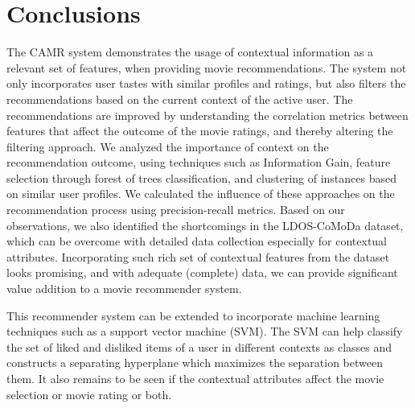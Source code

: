 \documentclass{article}
\begin{document}
%  
%
%
%

\section{Conclusions}

The CAMR system demonstrates the usage of contextual information as a relevant set of features, when providing movie recommendations. The system not only incorporates user tastes with similar profiles and ratings, but also filters the recommendations based on the current context of the active user. The recommendations are improved by understanding the correlation metrics between features that affect the outcome of the movie ratings, and thereby altering the filtering approach. We analyzed the importance of context on the recommendation outcome, using techniques such as Information Gain, feature selection through forest of trees classification, and clustering of instances based on similar user profiles. We calculated the influence of these approaches on the recommendation process using precision-recall metrics. Based on our observations, we also identified the shortcomings in the LDOS-CoMoDa dataset, which can be overcome with detailed data collection especially for contextual attributes. Incorporating such rich set of contextual features from the dataset looks promising, and with adequate (complete) data, we can provide significant value addition to a movie recommender system.

This recommender system can be extended to incorporate machine learning techniques such as a support vector machine (SVM). The SVM can help classify the set of liked and disliked items of a user in different contexts as classes and constructs a separating hyperplane which maximizes the separation between them. It also remains to be seen if the contextual attributes affect the movie selection or movie rating or both.
 
\end{document}
